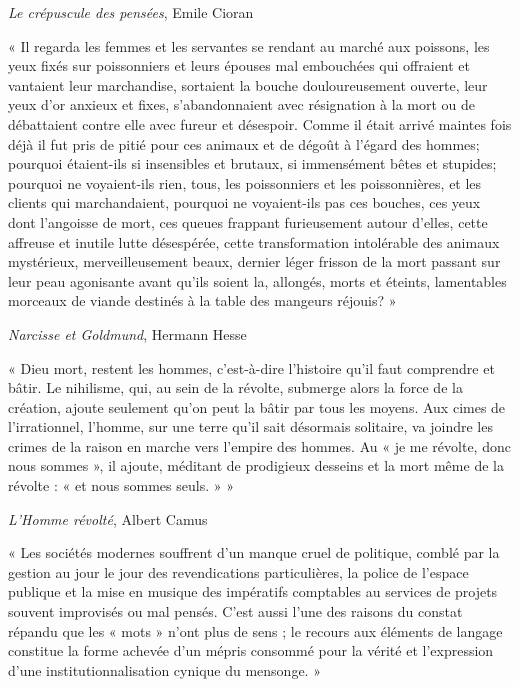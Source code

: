 \documentclass{article}
\begin{document}
\begin{flushright}\textit{Le crépuscule des pensées}, Emile Cioran\end{flushright}
\vspace{8pt}
\begin{center} « Il regarda les femmes et les servantes se rendant au marché aux poissons, les yeux fixés sur poissonniers et leurs épouses mal embouchées qui offraient et vantaient leur marchandise, sortaient la bouche douloureusement ouverte, leur yeux d’or anxieux et fixes, s’abandonnaient avec résignation à la mort ou de débattaient contre elle avec fureur et désespoir. Comme il était arrivé maintes fois déjà il fut pris de pitié pour ces animaux et de dégoût à l’égard des hommes; pourquoi étaient-ils si insensibles et brutaux, si immensément bêtes et stupides; pourquoi ne voyaient-ils rien, tous, les poissonniers et les poissonnières, et les clients qui marchandaient, pourquoi ne voyaient-ils pas ces bouches, ces yeux dont l’angoisse de mort, ces queues frappant furieusement autour d’elles, cette affreuse et inutile lutte désespérée, cette transformation intolérable des animaux mystérieux, merveilleusement beaux, dernier léger frisson de la mort passant sur leur peau agonisante avant qu’ils soient la, allongés, morts et éteints, lamentables morceaux de viande destinés à la table des mangeurs réjouis? » \end{center}

\begin{flushright}\textit{Narcisse et Goldmund}, Hermann Hesse\end{flushright}
\vspace{7pt}
\begin{center} « Dieu mort, restent les hommes, c’est-à-dire l’histoire qu’il faut comprendre et bâtir. Le nihilisme, qui, au sein de la révolte, submerge alors la force de la création, ajoute seulement qu’on peut la bâtir par tous les moyens. Aux cimes de l’irrationnel, l’homme, sur une terre qu’il sait désormais solitaire, va joindre les crimes de la raison en marche vers l’empire des hommes. Au « je me révolte, donc nous sommes », il ajoute, méditant de prodigieux desseins et la mort même de la révolte : « et nous sommes seuls. » » \end{center}

\begin{flushright}\textit{L'Homme révolté}, Albert Camus\end{flushright}
\vspace{7pt}
\begin{center} « Les sociétés modernes souffrent d’un manque cruel de politique, comblé par la gestion au jour le jour des revendications particulières, la police de l’espace publique et la mise en musique des impératifs comptables au services de projets souvent improvisés ou mal pensés. C’est aussi l’une des raisons du constat répandu que les « mots » n’ont plus de sens ; le recours aux éléments de langage constitue la forme achevée d’un mépris consommé pour la vérité et l’expression d’une institutionnalisation cynique du mensonge. » \end{center}
\end{document}
